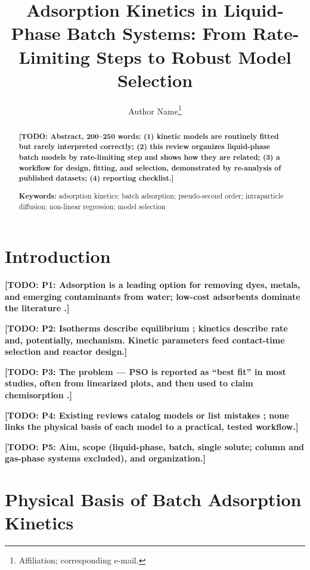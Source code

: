 \documentclass[11pt,a4paper]{article}
\title{Adsorption Kinetics in Liquid-Phase Batch Systems: From Rate-Limiting
       Steps to Robust Model Selection}
\author{Author Name\thanks{Affiliation; corresponding e-mail.}}
\date{}
\newcommand{\todo}[1]{\textbf{[TODO: #1]}}
\begin{document}
\maketitle

\begin{abstract}
\todo{Abstract, 200--250 words: (1) kinetic models are routinely fitted
but rarely interpreted correctly; (2) this review organizes liquid-phase
batch models by rate-limiting step and shows how they are related;
(3) a workflow for design, fitting, and selection, demonstrated by
re-analysis of published datasets; (4) reporting checklist.}

\medskip
\noindent\textbf{Keywords:} adsorption kinetics; batch adsorption;
pseudo-second order; intraparticle diffusion; non-linear regression;
model selection
\end{abstract}

\section{Introduction}
\label{sec:intro}

\todo{P1: Adsorption is a leading option for removing dyes, metals, and
emerging contaminants from water; low-cost adsorbents dominate the
literature \parencite{Bailey1999_LowCostHeavyMetals,Crini2006_LowCostDye}.}

\todo{P2: Isotherms describe equilibrium \parencite{Foo2010_IsothermModeling};
kinetics describe rate and, potentially, mechanism. Kinetic parameters feed
contact-time selection and reactor design.}

\todo{P3: The problem --- PSO is reported as ``best fit'' in most studies,
often from linearized plots, and then used to claim chemisorption
\parencite{Tran2017_AdsorptionMistakes,Simonin2016_PFOvsPSO}.}

\todo{P4: Existing reviews catalog models \parencite{Wang2020_KineticModels}
or list mistakes \parencite{Tran2017_AdsorptionMistakes}; none links the
physical basis of each model to a practical, tested workflow.}

\todo{P5: Aim, scope (liquid-phase, batch, single solute; column and
gas-phase systems excluded), and organization.}

\section{Physical Basis of Batch Adsorption Kinetics}
\label{sec:basis}
\end{document}
